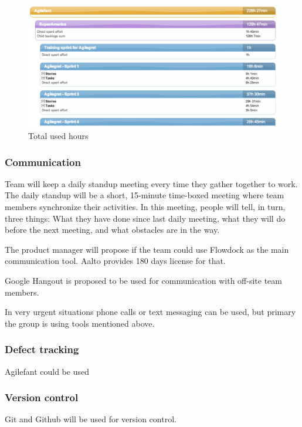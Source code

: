 \begin{figure}[H]
\centering
\includegraphics[width=1\textwidth]{imgs/totalhours.png}
\caption{Total used hours}
\label{fig:totalhours}
\end{figure}

\subsubsection{Communication}

Team will keep a daily standup meeting every time they gather together to work. 
The daily standup will be a short, 15-minute time-boxed meeting where team 
members synchronize their activities. In this meeting, people will tell, in 
turn, three things: What they have done since last daily meeting, what they 
will do before the next meeting, and what obstacles are in the way.  

The product manager will propose if the team could use Flowdock as the main 
communication tool. Aalto provides 180 days license for that.

Google Hangout is proposed to be used for communication with off-site team 
members.

In very urgent situations phone calls or text messaging can be used, but primary the group is using tools mentioned above.

\subsubsection{Defect tracking}

Agilefant could be used

\subsubsection{Version control}

Git and Github will be used for version control. 

